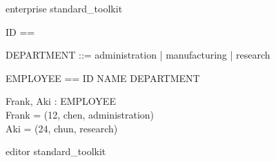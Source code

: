 \documentclass{llncs}
\begin{document}
\begin{zsection}
\SECTION enterprise \parents standard\_toolkit
\end{zsection}

\begin{zed}
[NAME]
\end{zed}
\begin{zed}
ID == \nat
\end{zed}
\begin{zed}
DEPARTMENT ::= administration | manufacturing | research
\end{zed}
\begin{zed}
EMPLOYEE == ID \cross NAME \cross DEPARTMENT
\end{zed}
\begin{axdef}
  Frank, Aki : EMPLOYEE \\
\where Frank = (12, chen, administration) \\
  Aki = (24, chun, research)
\end{axdef}

\begin{zsection}
\SECTION editor \parents standard\_toolkit
\end{zsection}
\end{document}
